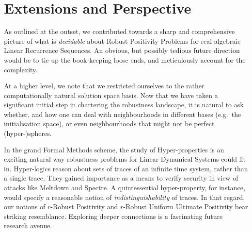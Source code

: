 \section{Extensions and Perspective}
As outlined at the outset, we contributed towards a sharp and comprehensive picture of what is \textit{decidable} about Robust Positivity Problems for real algebraic Linear Recurrence Sequences. An obvious, but possibly tedious future direction would be to tie up the book-keeping loose ends, and meticulously account for the complexity. 

At a higher level, we note that we restricted ourselves to the rather computationally natural solution space basis. Now that we have taken a significant initial step in chartering the robustness landscape, it is natural to ask whether, and how one can deal with neighbourhoods in different bases (e.g.\ the initialisation space), or even neighbourhoods that might not be perfect (hyper-)spheres.

In the grand Formal Methods scheme, the study of Hyper-properties \cite{hyperproperties} is an exciting natural way robustness problems for Linear Dynamical Systems could fit in. Hyper-logics reason about sets of traces of an infinite time system, rather than a single trace. They gained importance as a means to verify security in view of attacks like Meltdown and Spectre. A quintessential hyper-property, for instance, would specify a reasonable notion of \textit{indistinguishability} of traces. In that regard, our notions of $r$-Robust Positivity and $r$-Robust Uniform Ultimate Positivity bear striking resemblance. Exploring deeper connections is a fascinating future research avenue.
